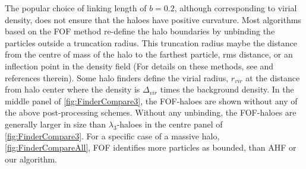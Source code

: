 \documentclass[fleqn,usenatbib,useAMS]{mnras}
\begin{document}
The popular choice of linking length of $b=0.2$, although corresponding to virial density, does not ensure that the haloes have positive curvature. Most algorithms based on the FOF method re-define the halo boundaries by unbinding the particles outside a truncation radius. This truncation radius maybe the distance from the centre of mass of the halo to the farthest particle, rms distance, or an inflection point in the density field (For details on these methods, see \citealt{Knebe2011a} and references therein). Some halo finders define the virial radius, $r_{vir}$ at the distance from halo center where the density is $\Delta_{vir}$ times the background density. In the middle panel of \autoref{fig:FinderCompare3}, the FOF-haloes are shown without any of the above post-processing schemes. Without any unbinding, the FOF-haloes are generally larger in size than $\lambda_3$-haloes in the centre panel of \autoref{fig:FinderCompare3}. For a specific case of a massive halo, \autoref{fig:FinderCompareAll}, FOF identifies more particles as bounded, than AHF or our algorithm.  
\end{document}
